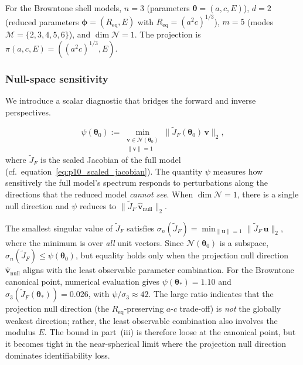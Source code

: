 \begin{remark}
For the Browntone shell models, $n=3$ (parameters $\boldsymbol{\theta}=(a,c,E)$),
$d=2$ (reduced parameters $\boldsymbol{\phi}=(R_\mathrm{eq},E)$ with
$R_\mathrm{eq}=(a^2 c)^{1/3}$), $m=5$ (modes $\mathcal{M}=\{2,3,4,5,6\}$),
and $\dim\mathcal{N}=1$.  The projection is
$\pi(a,c,E)=((a^2 c)^{1/3},E)$.
\end{remark}

\subsubsection{Null-space sensitivity}

We introduce a scalar diagnostic that bridges the forward and inverse
perspectives.

\begin{equation}
  \psi(\boldsymbol{\theta}_0)
  :=
  \min_{\substack{\mathbf{v}\in\mathcal{N}(\boldsymbol{\theta}_0)\\[2pt]
  \|\mathbf{v}\|=1}}
  \bigl\|\widetilde{J}_F(\boldsymbol{\theta}_0)\,\mathbf{v}\bigr\|_2,
  \label{eq:thm4_psi_def}
\end{equation}
where $\widetilde{J}_F$ is the scaled Jacobian of the full model (cf.\
equation~\eqref{eq:p10_scaled_jacobian}).  The quantity $\psi$ measures how
sensitively the full model's spectrum responds to perturbations along the
directions that the reduced model \emph{cannot see}.  When
$\dim\mathcal{N}=1$, there is a single null direction and $\psi$ reduces to
$\|\widetilde{J}_F\,\hat{\mathbf{v}}_\mathrm{null}\|_2$.

\begin{remark}
\label{rem:thm4_psi_vs_sigma}
The smallest singular value of $\widetilde{J}_F$ satisfies
$\sigma_n(\widetilde{J}_F)=\min_{\|\mathbf{u}\|=1}\|\widetilde{J}_F\,\mathbf{u}\|_2$,
where the minimum is over \emph{all} unit vectors.  Since
$\mathcal{N}(\boldsymbol{\theta}_0)$ is a subspace,
$\sigma_n(\widetilde{J}_F)\leq\psi(\boldsymbol{\theta}_0)$, but equality holds
only when the projection null direction $\hat{\mathbf{v}}_\mathrm{null}$
aligns with the least observable parameter combination.  For the Browntone
canonical point, numerical evaluation gives
$\psi(\boldsymbol{\theta}_*)=1.10$ and
$\sigma_3(\widetilde{J}_F(\boldsymbol{\theta}_*))=0.026$, with
$\psi/\sigma_3\approx 42$.  The large ratio indicates that the projection null
direction (the $R_\mathrm{eq}$-preserving $a$-$c$ trade-off) is
\emph{not} the globally weakest direction; rather, the least observable
combination also involves the modulus $E$.  The bound in part~(iii) is
therefore loose at the canonical point, but it becomes tight in the
near-spherical limit where the projection null direction dominates
identifiability loss.
\end{remark}


